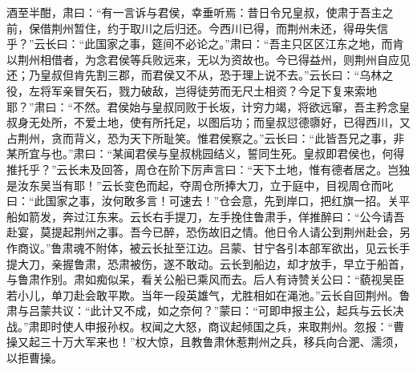 酒至半酣，肃曰：“有一言诉与君侯，幸垂听焉：昔日令兄皇叔，使肃于吾主之前，保借荆州暂住，约于取川之后归还。今西川已得，而荆州未还，得毋失信乎？”云长曰：“此国家之事，筵间不必论之。”肃曰：“吾主只区区江东之地，而肯以荆州相借者，为念君侯等兵败远来，无以为资故也。今已得益州，则荆州自应见还；乃皇叔但肯先割三郡，而君侯又不从，恐于理上说不去。”云长曰：“乌林之役，左将军亲冒矢石，戮力破敌，岂得徒劳而无尺土相资？今足下复来索地耶？”肃曰：“不然。君侯始与皇叔同败于长坂，计穷力竭，将欲远窜，吾主矜念皇叔身无处所，不爱土地，使有所托足，以图后功；而皇叔愆德隳好，已得西川，又占荆州，贪而背义，恐为天下所耻笑。惟君侯察之。”云长曰：“此皆吾兄之事，非某所宜与也。”肃曰：“某闻君侯与皇叔桃园结义，誓同生死。皇叔即君侯也，何得推托乎？”云长未及回答，周仓在阶下厉声言曰：“天下土地，惟有德者居之。岂独是汝东吴当有耶！”云长变色而起，夺周仓所捧大刀，立于庭中，目视周仓而叱曰：“此国家之事，汝何敢多言！可速去！”仓会意，先到岸口，把红旗一招。关平船如箭发，奔过江东来。云长右手提刀，左手挽住鲁肃手，佯推醉曰：“公今请吾赴宴，莫提起荆州之事。吾今已醉，恐伤故旧之情。他日令人请公到荆州赴会，另作商议。”鲁肃魂不附体，被云长扯至江边。吕蒙、甘宁各引本部军欲出，见云长手提大刀，亲握鲁肃，恐肃被伤，遂不敢动。云长到船边，却才放手，早立于船首，与鲁肃作别。肃如痴似呆，看关公船已乘风而去。后人有诗赞关公曰：“藐视吴臣若小儿，单刀赴会敢平欺。当年一段英雄气，尤胜相如在渑池。”云长自回荆州。鲁肃与吕蒙共议：“此计又不成，如之奈何？”蒙曰：“可即申报主公，起兵与云长决战。”肃即时使人申报孙权。权闻之大怒，商议起倾国之兵，来取荆州。忽报：“曹操又起三十万大军来也！”权大惊，且教鲁肃休惹荆州之兵，移兵向合淝、濡须，以拒曹操。

